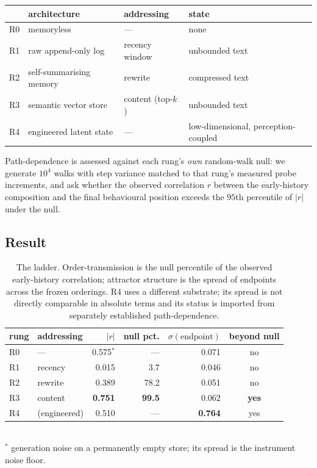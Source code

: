 \documentclass[11pt]{article}
\begin{document}
\begin{center}
\small
\begin{tabular}{@{}llll@{}}
\toprule
& architecture & addressing & state \\
\midrule
R0 & memoryless & --- & none \\
R1 & raw append-only log & recency window & unbounded text \\
R2 & self-summarising memory & rewrite & compressed text \\
R3 & semantic vector store & content (top-$k$) & unbounded text \\
R4 & engineered latent state & --- & low-dimensional, perception-coupled \\
\bottomrule
\end{tabular}
\end{center}

Path-dependence is assessed against each rung's \emph{own} random-walk null: we
generate $10^4$ walks with step variance matched to that rung's measured probe
increments, and ask whether the observed correlation $r$ between the early-history
composition and the final behavioural position exceeds the $95$th percentile of
$|r|$ under the null.

\subsection{Result}

\begin{table}[t]
\centering\small
\caption{The ladder. Order-transmission is the null percentile of the observed
early-history correlation; attractor structure is the spread of endpoints across the
frozen orderings. R4 uses a different substrate; its spread is not directly comparable
in absolute terms and its status is imported from separately established
path-dependence.}
\label{tab:ladder}
\begin{tabular}{@{}llrrrc@{}}
\toprule
rung & addressing & $|r|$ & null pct. & $\sigma(\text{endpoint})$ & beyond null \\
\midrule
R0 & --- & 0.575$^{*}$ & --- & 0.071 & no \\
R1 & recency & 0.015 & 3.7 & 0.046 & no \\
R2 & rewrite & 0.389 & 78.2 & 0.051 & no \\
R3 & content & \textbf{0.751} & \textbf{99.5} & 0.062 & \textbf{yes} \\
R4 & (engineered) & 0.510 & --- & \textbf{0.764} & yes \\
\bottomrule
\end{tabular}\\[0.3em]
{\footnotesize $^{*}$ generation noise on a permanently empty store; its spread is the
instrument noise floor.}
\end{table}
\end{document}
